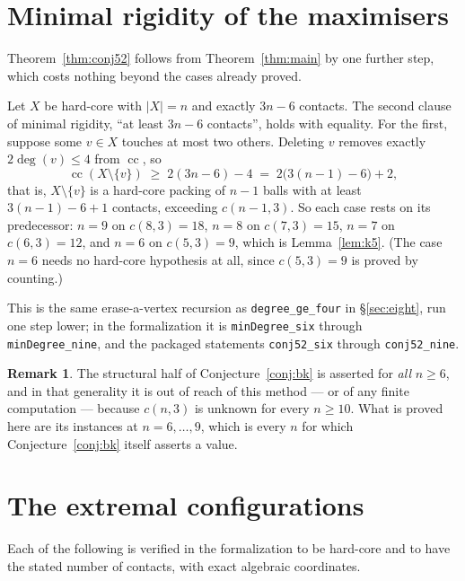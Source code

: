 \documentclass[11pt,a4paper]{article}
\theoremstyle{plain}
\theoremstyle{definition}
\newtheorem{remark}[theorem]{Remark}
\newcommand{\card}[1]{\lvert #1 \rvert}
\begin{document}
\section{Minimal rigidity of the maximisers}
\label{sec:minrigid}

Theorem~\ref{thm:conj52} follows from Theorem~\ref{thm:main} by one further step, which
costs nothing beyond the cases already proved.

Let $X$ be hard-core with $\card X = n$ and exactly $3n-6$ contacts. The second clause
of minimal rigidity, ``at least $3n-6$ contacts'', holds with equality. For the first,
suppose some $v \in X$ touches at most two others. Deleting $v$ removes exactly
$2\deg(v) \le 4$ from $\operatorname{cc}$, so
\[
  \operatorname{cc}(X \setminus \{v\}) \;\ge\; 2(3n-6) - 4 \;=\; 2\bigl(3(n-1)-6\bigr) + 2 ,
\]
that is, $X \setminus \{v\}$ is a hard-core packing of $n-1$ balls with at least
$3(n-1)-6+1$ contacts, exceeding $c(n-1,3)$. So each case rests on its predecessor:
$n=9$ on $c(8,3)=18$, $n=8$ on $c(7,3)=15$, $n=7$ on $c(6,3)=12$, and $n=6$ on
$c(5,3)=9$, which is Lemma~\ref{lem:k5}. (The case $n=6$ needs no hard-core hypothesis
at all, since $c(5,3)=9$ is proved by counting.)

This is the same erase-a-vertex recursion as \texttt{degree\_ge\_four} in
\S\ref{sec:eight}, run one step lower; in the formalization it is
\texttt{minDegree\_six} through \texttt{minDegree\_nine}, and the packaged statements
\texttt{conj52\_six} through \texttt{conj52\_nine}.

\begin{remark}
The structural half of Conjecture~\ref{conj:bk} is asserted for \emph{all} $n \ge 6$,
and in that generality it is out of reach of this method --- or of any finite
computation --- because $c(n,3)$ is unknown for every $n \ge 10$. What is proved here
are its instances at $n = 6,\dots,9$, which is every $n$ for which
Conjecture~\ref{conj:bk} itself asserts a value.
\end{remark}

\section{The extremal configurations}
\label{sec:constructions}

Each of the following is verified in the formalization to be hard-core and to have the
stated number of contacts, with exact algebraic coordinates.
\end{document}
